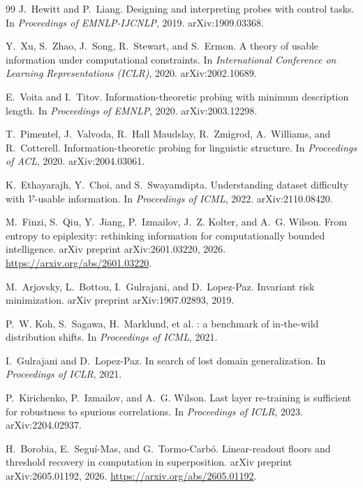 \documentclass[twocolumn,10pt]{article}
\theoremstyle{definition}
\theoremstyle{remark}
\begin{document}
\begin{thebibliography}{99}
J.~Hewitt and P.~Liang.
\newblock Designing and interpreting probes with control tasks.
\newblock In \emph{Proceedings of EMNLP-IJCNLP}, 2019.
\newblock arXiv:1909.03368.

Y.~Xu, S.~Zhao, J.~Song, R.~Stewart, and S.~Ermon.
\newblock A theory of usable information under computational
constraints.
\newblock In \emph{International Conference on Learning
Representations (ICLR)}, 2020.
\newblock arXiv:2002.10689.

E.~Voita and I.~Titov.
\newblock Information-theoretic probing with minimum description
length.
\newblock In \emph{Proceedings of EMNLP}, 2020.
\newblock arXiv:2003.12298.

T.~Pimentel, J.~Valvoda, R.~Hall Maudslay, R.~Zmigrod,
A.~Williams, and R.~Cotterell.
\newblock Information-theoretic probing for linguistic structure.
\newblock In \emph{Proceedings of ACL}, 2020.
\newblock arXiv:2004.03061.

K.~Ethayarajh, Y.~Choi, and S.~Swayamdipta.
\newblock Understanding dataset difficulty with
$\mathcal{V}$-usable information.
\newblock In \emph{Proceedings of ICML}, 2022.
\newblock arXiv:2110.08420.

M.~Finzi, S.~Qiu, Y.~Jiang, P.~Izmailov, J.~Z. Kolter, and
A.~G. Wilson.
\newblock From entropy to epiplexity: rethinking information for
computationally bounded intelligence.
\newblock arXiv preprint arXiv:2601.03220, 2026.
\newblock \url{https://arxiv.org/abs/2601.03220}.

M.~Arjovsky, L.~Bottou, I.~Gulrajani, and D.~Lopez-Paz.
\newblock Invariant risk minimization.
\newblock arXiv preprint arXiv:1907.02893, 2019.

P.~W. Koh, S.~Sagawa, H.~Marklund, et al.
: a benchmark of in-the-wild distribution shifts.
\newblock In \emph{Proceedings of ICML}, 2021.

I.~Gulrajani and D.~Lopez-Paz.
\newblock In search of lost domain generalization.
\newblock In \emph{Proceedings of ICLR}, 2021.

P.~Kirichenko, P.~Izmailov, and A.~G. Wilson.
\newblock Last layer re-training is sufficient for robustness to
spurious correlations.
\newblock In \emph{Proceedings of ICLR}, 2023.
\newblock arXiv:2204.02937.

H.~Borobia, E.~Segu\'i-Mas, and G.~Tormo-Carb\'o.
\newblock Linear-readout floors and threshold recovery in computation in
superposition.
\newblock arXiv preprint arXiv:2605.01192, 2026.
\newblock \url{https://arxiv.org/abs/2605.01192}.


\end{thebibliography}
\end{document}
